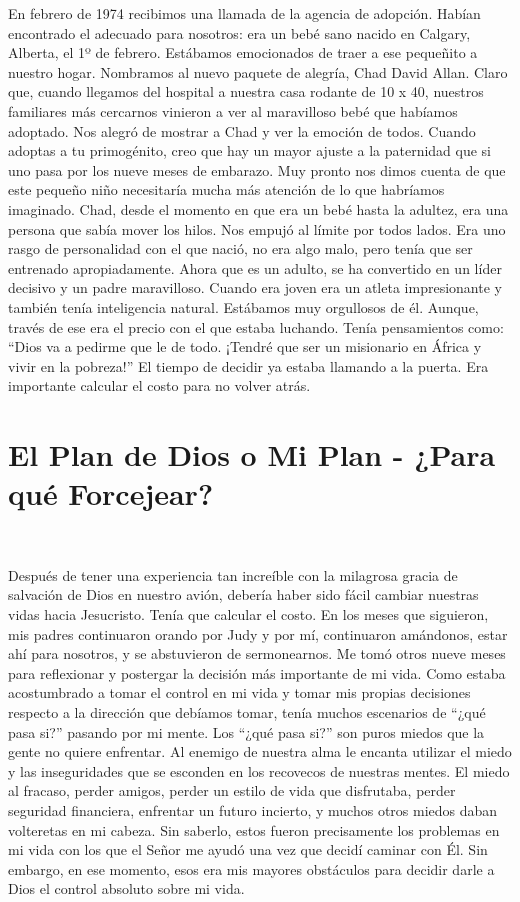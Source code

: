 \documentclass[twoside, 12pt]{book}
\begin{document}
En febrero de 1974 recibimos una llamada de la agencia de adopción. Habían encontrado el adecuado para nosotros: era un bebé sano nacido en Calgary, Alberta, el 1º de febrero. Estábamos emocionados de traer a ese pequeñito a nuestro hogar.
Nombramos al nuevo paquete de alegría, Chad David Allan. Claro que, cuando llegamos del hospital a nuestra casa rodante de 10 x 40, nuestros familiares más cercarnos vinieron a ver al maravilloso bebé que habíamos adoptado. Nos alegró de mostrar a Chad y ver la emoción de todos. Cuando adoptas a tu primogénito, creo que hay un mayor ajuste a la paternidad que si uno pasa por los nueve meses de embarazo. Muy pronto nos dimos cuenta de que este pequeño niño necesitaría mucha más atención de lo que habríamos imaginado. Chad, desde el momento en que era un bebé hasta la adultez, era una persona que sabía mover los hilos. Nos empujó al límite por todos lados. Era uno rasgo de personalidad con el que nació, no era algo malo, pero tenía que ser entrenado apropiadamente. Ahora que es un adulto, se ha convertido en un líder decisivo y un padre maravilloso. Cuando era joven era un atleta impresionante y también tenía inteligencia natural. Estábamos muy orgullosos de él. Aunque, través de ese era el precio con el que estaba luchando. Tenía pensamientos como: “Dios va a pedirme que le de todo. ¡Tendré que ser un misionario en África y vivir en la pobreza!” El tiempo de decidir ya estaba llamando a la puerta. Era importante calcular el costo para no volver atrás.\\




\chapter{El Plan de Dios o Mi Plan - ¿Para qué Forcejear?}
\

Después de tener una experiencia tan increíble con la milagrosa gracia de salvación de Dios en nuestro avión, debería haber sido fácil cambiar nuestras vidas hacia Jesucristo. Tenía que calcular el costo. En los meses que siguieron, mis padres continuaron orando por Judy y por mí, continuaron amándonos, estar ahí para nosotros, y se abstuvieron de sermonearnos. Me tomó otros nueve meses para reflexionar y postergar la decisión más importante de mi vida. Como estaba acostumbrado a tomar el control en mi vida y tomar mis propias decisiones respecto a la dirección que debíamos tomar, tenía muchos escenarios de “¿qué pasa si?” pasando por mi mente. Los “¿qué pasa si?” son puros miedos que la gente no quiere enfrentar. Al enemigo de nuestra alma le encanta utilizar el miedo y las inseguridades que se esconden en los recovecos de nuestras mentes. El miedo al fracaso, perder amigos, perder un estilo de vida que disfrutaba, perder seguridad financiera, enfrentar un futuro incierto, y muchos otros miedos daban volteretas en mi cabeza. Sin saberlo, estos fueron precisamente los problemas en mi vida con los que el Señor me ayudó una vez que decidí caminar con Él. Sin embargo, en ese momento, esos era mis mayores obstáculos para decidir darle a Dios el control absoluto sobre mi vida.\\
\end{document}
